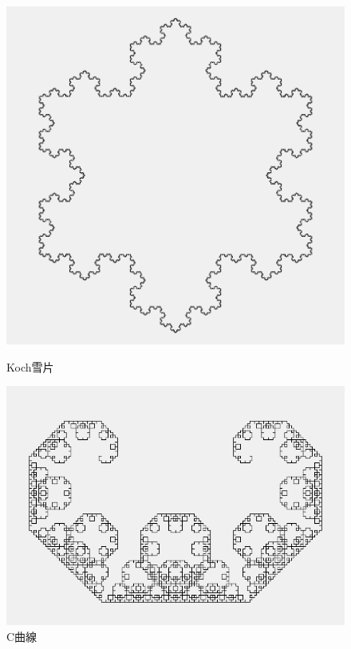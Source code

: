 \documentclass[dvipdfmx]{jsarticle}
\theoremstyle{definition}
\begin{document}
\begin{figure}[ht]
\begin{minipage}{0.5\hsize}
    \begin{center}
        \includegraphics[scale=0.20]{figure/koch_snowflake.png}
    \end{center}
    \caption{Koch雪片}
    \label{pic_koch_snowflake}
\end{minipage}
\begin{minipage}{0.49\hsize}
    \begin{center}
        \includegraphics[scale=0.22]{figure/c_curve.png}
    \end{center}
    \caption{C曲線}
\end{minipage}
\end{figure}
\end{document}
